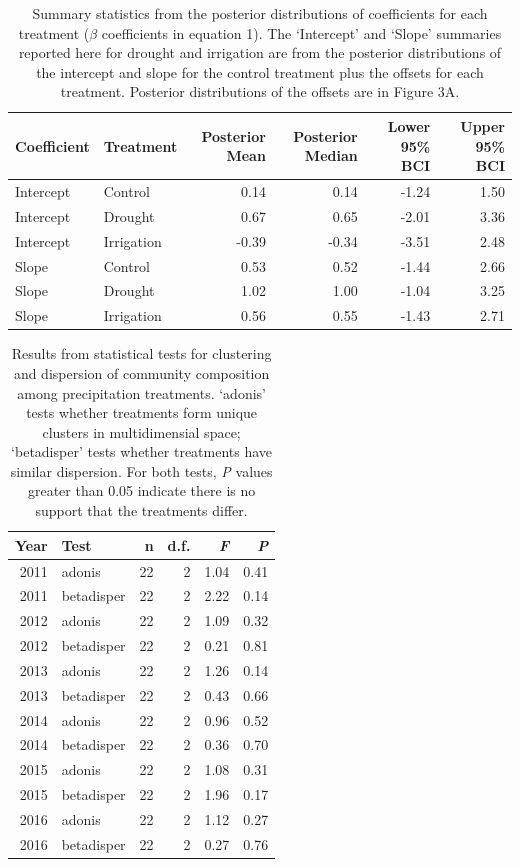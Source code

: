 \documentclass[fleqn,10pt,lineno]{wlpeerj} %
\begin{document}
\begin{table}[ht]
\centering
\caption{Summary statistics from the posterior distributions of coefficients for each treatment ($\beta$ coefficients in equation 1). The `Intercept' and `Slope' summaries reported here for drought and irrigation are from the posterior distributions of the intercept and slope for the control treatment plus the offsets for each treatment. Posterior distributions of the offsets are in Figure 3A.} 
\begingroup\normalsize
\begin{tabular}{llrrrr}
  \hline
Coefficient & Treatment & Posterior Mean & Posterior Median & Lower 95\% BCI & Upper 95\% BCI \\ 
  \hline
Intercept & Control & 0.14 & 0.14 & -1.24 & 1.50 \\ 
  Intercept & Drought & 0.67 & 0.65 & -2.01 & 3.36 \\ 
  Intercept & Irrigation & -0.39 & -0.34 & -3.51 & 2.48 \\ 
  Slope & Control & 0.53 & 0.52 & -1.44 & 2.66 \\ 
  Slope & Drought & 1.02 & 1.00 & -1.04 & 3.25 \\ 
  Slope & Irrigation & 0.56 & 0.55 & -1.43 & 2.71 \\ 
   \hline
\end{tabular}
\endgroup
\end{table}\begin{table}[ht]
\centering
\caption{Results from statistical tests for clustering and dispersion of community composition among precipitation treatments. `adonis' tests whether treatments form unique clusters in multidimensial space; `betadisper' tests whether treatments have similar dispersion. For both tests, \emph{P} values greater than 0.05 indicate there is no support that the treatments differ.} 
\begingroup\normalsize
\begin{tabular}{rlrrrr}
  \hline
Year & Test & n & d.f. & \emph{F} & \emph{P} \\ 
  \hline
2011 & adonis &  22 &   2 & 1.04 & 0.41 \\ 
  2011 & betadisper &  22 &   2 & 2.22 & 0.14 \\ 
  2012 & adonis &  22 &   2 & 1.09 & 0.32 \\ 
  2012 & betadisper &  22 &   2 & 0.21 & 0.81 \\ 
  2013 & adonis &  22 &   2 & 1.26 & 0.14 \\ 
  2013 & betadisper &  22 &   2 & 0.43 & 0.66 \\ 
  2014 & adonis &  22 &   2 & 0.96 & 0.52 \\ 
  2014 & betadisper &  22 &   2 & 0.36 & 0.70 \\ 
  2015 & adonis &  22 &   2 & 1.08 & 0.31 \\ 
  2015 & betadisper &  22 &   2 & 1.96 & 0.17 \\ 
  2016 & adonis &  22 &   2 & 1.12 & 0.27 \\ 
  2016 & betadisper &  22 &   2 & 0.27 & 0.76 \\ 
   \hline
\end{tabular}
\endgroup
\end{table}
\end{document}
